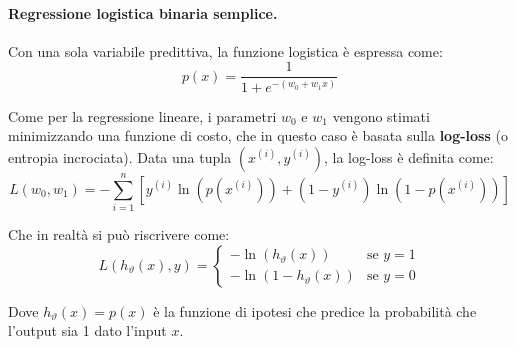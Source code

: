 \paragraph{Regressione logistica binaria semplice.}
Con una sola variabile predittiva, la funzione logistica è espressa come:
\[
p(x) = \frac{1}{1 + e^{-(w_0 + w_1 x)}}
\]

Come per la regressione lineare, i parametri $w_0$ e $w_1$ vengono stimati minimizzando una funzione di costo, che in questo caso è basata sulla \textbf{log-loss} (o entropia incrociata). Data una tupla $(x^{(i)}, y^{(i)})$, la log-loss è definita come:
\[
L(w_0, w_1) = -\sum_{i=1}^{n} \left[ y^{(i)} \ln(p(x^{(i)})) + (1 - y^{(i)}) \ln(1 - p(x^{(i)})) \right]
\]

Che in realtà si può riscrivere come:
\[
L(h_{\vartheta}(x), y) = 
\begin{cases}
-\ln(h_{\vartheta}(x)) & \text{se } y = 1\\
-\ln(1 - h_{\vartheta}(x)) & \text{se } y = 0
\end{cases}
\]

Dove $h_{\vartheta}(x) = p(x)$ è la funzione di ipotesi che predice la probabilità che l'output sia 1 dato l'input $x$.